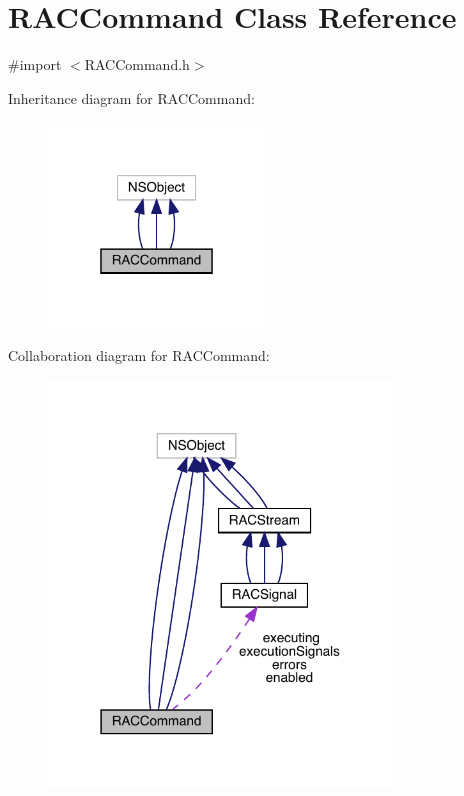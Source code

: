 \hypertarget{interface_r_a_c_command}{}\section{R\+A\+C\+Command Class Reference}
\label{interface_r_a_c_command}


{\ttfamily \#import $<$R\+A\+C\+Command.\+h$>$}



Inheritance diagram for R\+A\+C\+Command\+:\nopagebreak
\begin{figure}[H]
\begin{center}
\leavevmode
\includegraphics[width=163pt]{interface_r_a_c_command__inherit__graph}
\end{center}
\end{figure}


Collaboration diagram for R\+A\+C\+Command\+:\nopagebreak
\begin{figure}[H]
\begin{center}
\leavevmode
\includegraphics[width=259pt]{interface_r_a_c_command__coll__graph}
\end{center}
\end{figure}
